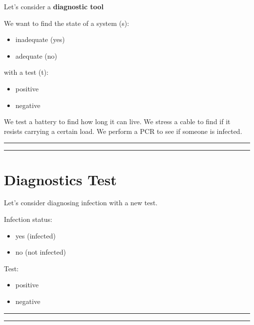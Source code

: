\documentclass[
]{book}
\providecommand{\tightlist}{%
  \setlength{\itemsep}{0pt}\setlength{\parskip}{0pt}}
\begin{document}
Let's consider a \textbf{diagnostic tool}

We want to find the state of a system (s):

\begin{itemize}
\tightlist
\item
  inadequate (yes)
\item
  adequate (no)
\end{itemize}

with a test (t):

\begin{itemize}
\tightlist
\item
  positive
\item
  negative
\end{itemize}

We test a battery to find how long it can live. We stress a cable to find if it resists carrying a certain load. We perform a PCR to see if someone is infected.

\begin{center}\rule{0.5\linewidth}{0.5pt}\end{center}

\begin{center}\rule{0.5\linewidth}{0.5pt}\end{center}

\hypertarget{diagnostics-test}{%
\section{Diagnostics Test}\label{diagnostics-test}}

Let's consider diagnosing infection with a new test.

Infection status:

\begin{itemize}
\tightlist
\item
  yes (infected)
\item
  no (not infected)
\end{itemize}

Test:

\begin{itemize}
\tightlist
\item
  positive
\item
  negative
\end{itemize}

\begin{center}\rule{0.5\linewidth}{0.5pt}\end{center}

\begin{center}\rule{0.5\linewidth}{0.5pt}\end{center}
\end{document}
